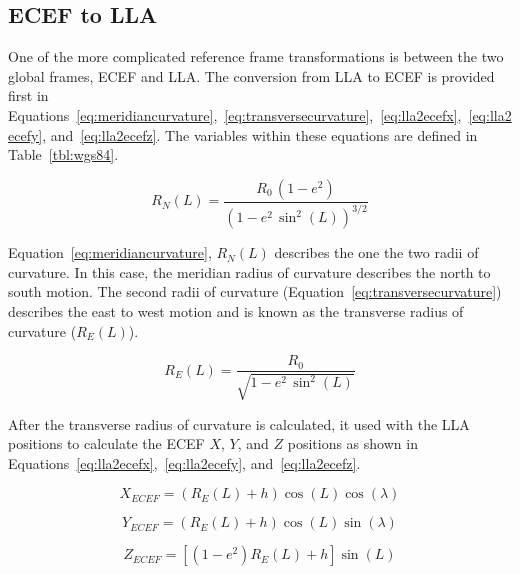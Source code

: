 \subsection{ECEF to LLA}

One of the more complicated reference frame transformations is between the two global frames, ECEF and LLA\@. The conversion from LLA to ECEF is provided first in Equations~\ref{eq:meridiancurvature},~\ref{eq:transversecurvature},~\ref{eq:lla2ecefx},~\ref{eq:lla2ecefy}, and~\ref{eq:lla2ecefz}. The variables within these equations are defined in Table~\ref{tbl:wgs84}.

\begin{equation}\label{eq:meridiancurvature}
    R_N (L) = \frac{R_0 \, \left(1 - e^2\right)}{{\left(1 - e^2 \, \sin^2 {\left(L\right)}\right)}^{3/2}}
\end{equation}

Equation~\ref{eq:meridiancurvature}, \(R_N (L)\) describes the one the two radii of curvature. In this case, the meridian radius of curvature describes the north to south motion. The second radii of curvature (Equation~\ref{eq:transversecurvature}) describes the east to west motion and is known as the transverse radius of curvature (\(R_E (L) \)).

\begin{equation}\label{eq:transversecurvature}
    R_E (L) = \frac{R_0}{\sqrt{1 - e^2 \, \sin^2 {\left(L\right)}}}
\end{equation}

After the transverse radius of curvature is calculated, it used with the LLA positions to calculate the ECEF \(X\), \(Y\), and \(Z\) positions as shown in Equations~\ref{eq:lla2ecefx},~\ref{eq:lla2ecefy}, and~\ref{eq:lla2ecefz}.

\begin{equation}\label{eq:lla2ecefx}
    X_{ECEF} = \left(R_E (L) + h\right)\cos \left(L\right)\cos \left(\lambda\right)
\end{equation}

\begin{equation}\label{eq:lla2ecefy}
    Y_{ECEF} = \left(R_E (L) + h\right)\cos \left(L\right)\sin \left(\lambda\right)
\end{equation}

\begin{equation}\label{eq:lla2ecefz}
    Z_{ECEF} = \left[\left(1 - e^2\right) R_E (L) + h\right] \sin \left(L\right)
\end{equation}

